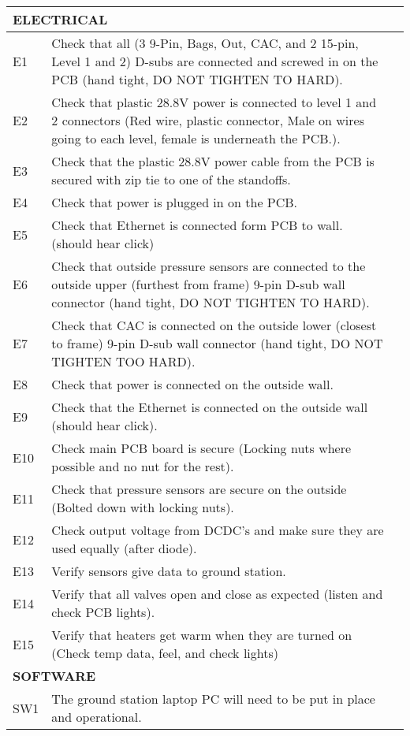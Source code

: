 \begin{longtable} {|m{}|m{}|m{}|}
\multicolumn{2}{|l|}{  \textbf{ELECTRICAL} } & \\ \hline
E1 & Check that all (3 9-Pin, Bags, Out, CAC, and 2 15-pin, Level 1 and 2) D-subs are connected and screwed in on the PCB (hand tight, DO NOT TIGHTEN TO HARD). & \\ \hline
E2 & Check that plastic 28.8V power is connected to level 1 and 2 connectors (Red wire, plastic connector, Male on wires going to each level, female is underneath the PCB.).& \\ \hline
E3 & Check that the plastic 28.8V power cable from the PCB is secured with zip tie to one of the standoffs. & \\ \hline 
E4 & Check that power is plugged in on the PCB. & \\ \hline
E5 & Check that Ethernet is connected form PCB to wall. (should hear click) & \\ \hline
E6 & Check that outside pressure sensors are connected to the outside upper (furthest from frame) 9-pin D-sub wall connector (hand tight, DO NOT TIGHTEN TO HARD). & \\ \hline
E7 & Check that CAC is connected on the outside lower (closest to frame) 9-pin D-sub wall connector (hand tight, DO NOT TIGHTEN TOO HARD). & \\ \hline
E8 & Check that power is connected on the outside wall. & \\ \hline
E9 & Check that the Ethernet is connected on the outside wall (should hear click). & \\ \hline
E10 & Check main PCB board is secure (Locking nuts where possible and no nut for the rest).\\ \hline
E11 & Check that pressure sensors are secure on the outside (Bolted down with locking nuts). & \\ \hline
E12 & Check output voltage from DCDC's and make sure they are used equally (after diode). & \\ \hline
E13 & Verify sensors give data to ground station. & \\ \hline
E14 & Verify that all valves open and close as expected (listen and check PCB lights).& \\ \hline
E15 & Verify that heaters get warm when they are turned on (Check temp data, feel, and check lights)& \\ \hline
\multicolumn{2}{|l|}{  \textbf{SOFTWARE} } & \\ \hline
SW1 & The ground station laptop PC will need to be put in place and operational. & \\ \hline

\end{longtable}
